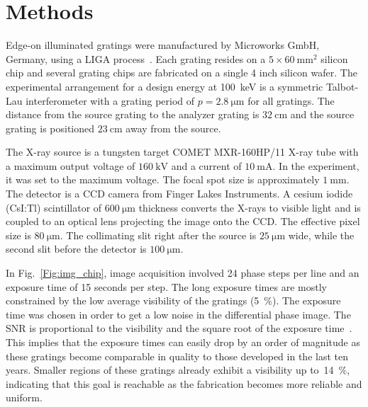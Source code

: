 \section{Methods}
Edge-on illuminated gratings were manufactured by Microworks GmbH, Germany, using a LIGA process~\cite{Kenntner2010}. Each grating
resides on a $5 \times \SI{60}{\milli\metre^2}$ silicon chip and several
grating chips are fabricated on a single 4 inch silicon wafer. The
experimental arrangement for a design energy at \SI{100}{\kilo\electronvolt}
is a symmetric Talbot-Lau interferometer with a grating period of $p =
\SI{2.8}{\micro \metre}$ for all gratings. The distance from the source
grating to the analyzer grating is $\SI{32}{\centi\metre}$ and the source
grating is positioned $\SI{23}{\centi\metre}$ away from the source.

The X-ray source is a tungsten target COMET MXR-160HP/11 X-ray tube with a maximum output
voltage of $\SI{160}{\kilo\volt}$ and a current of $\SI{10}{\milli\ampere}$. In the experiment, it was set to the
maximum voltage. The focal spot size is approximately
$\SI{1}{\milli\metre}$. The detector is a CCD camera from Finger Lakes
Instruments. A cesium iodide (CsI:Tl) scintillator of $\SI{600}{\micro
\metre}$ thickness converts the X-rays to visible light and is coupled to
an optical lens projecting the image onto the CCD\@. The effective pixel size
is $\SI{80}{\micro\metre}$. The collimating slit right after the source is 
$\SI{25}{\micro\metre}$ wide, while the second slit before the detector is
$\SI{100}{\micro\metre}$.

In Fig.~\ref{Fig:img_chip}, image acquisition involved 24 phase steps per
line and an exposure time of 15 seconds per step. The long
exposure times are mostly constrained by the low average visibility of the
gratings (\SI{5}{\percent}). The exposure time was chosen in order to
get a low noise in the differential phase image. The \ac{SNR} is
proportional to the visibility and the square root of the exposure
time~\cite{Raupach2011}.
This implies that the exposure times can easily drop by an order of
magnitude as these gratings become comparable in quality to those developed
in the last ten years. 
Smaller regions of these gratings already exhibit a visibility up
to~\SI{14}{\percent}, indicating that this goal is reachable as the
fabrication becomes more reliable and uniform.

